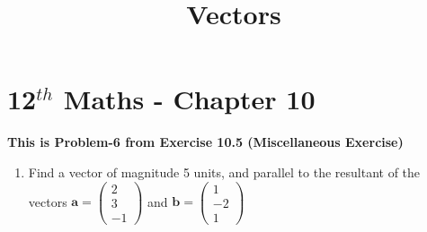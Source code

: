 \documentclass[12pt]{article}
\newcommand{\myvec}[1]{\ensuremath{\begin{pmatrix}#1\end{pmatrix}}}
\let\vec\mathbf
\begin{document}
\begin{center}
\title{\textbf{  Vectors}}
\date{\vspace{-5ex}} %
\maketitle
\end{center}
\setcounter{page}{1}\section{12$^{th}$ Maths - Chapter 10}
\textbf{This is Problem-6 from Exercise 10.5 (Miscellaneous Exercise)}
\begin{enumerate}

\item Find a vector of magnitude 5 units, and parallel to the resultant of the vectors $\vec{a} =\myvec{2\\3\\-1}$ and $\vec{b}=\myvec{1\\-2\\1}$

\end{enumerate}
\end{document}

